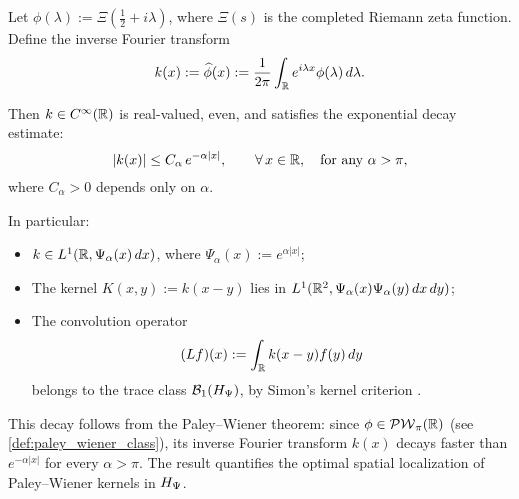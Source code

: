 \begin{lemma}
\label{lem:decay_inverse_fourier_xi}
Let \( \phi(\lambda) := \Xi\left( \tfrac{1}{2} + i\lambda \right) \), where \( \Xi(s) \) is the completed Riemann zeta function. Define the inverse Fourier transform
\[
k(x) := \widehat{\phi}(x) := \frac{1}{2\pi} \int_{\mathbb{R}} e^{i\lambda x} \phi(\lambda)\, d\lambda.
\]

Then \( k \in C^\infty(\mathbb{R}) \) is real-valued, even, and satisfies the exponential decay estimate:
\[
|k(x)| \le C_\alpha\, e^{-\alpha |x|}, \qquad \forall\, x \in \mathbb{R}, \quad \text{for any } \alpha > \pi,
\]
where \( C_\alpha > 0 \) depends only on \( \alpha \).

\medskip
\noindent In particular:
\begin{itemize}
  \item \( k \in L^1(\mathbb{R}, \Psi_\alpha(x)\, dx) \), where \( \Psi_\alpha(x) := e^{\alpha |x|} \);
  \item The kernel \( K(x,y) := k(x - y) \) lies in \( L^1(\mathbb{R}^2, \Psi_\alpha(x)\Psi_\alpha(y)\, dx\, dy) \);
  \item The convolution operator
  \[
  (Lf)(x) := \int_{\mathbb{R}} k(x - y) f(y)\, dy
  \]
  belongs to the trace class \( \mathcal{B}_1(H_{\Psi}) \), by Simon’s kernel criterion \cite[Thm.~4.2]{Simon2005TraceIdeals}.
\end{itemize}

\medskip
\noindent
This decay follows from the Paley--Wiener theorem: since \( \phi \in \mathcal{PW}_{\pi}(\mathbb{R}) \) (see \cref{def:paley_wiener_class}), its inverse Fourier transform \( k(x) \) decays faster than \( e^{-\alpha |x|} \) for every \( \alpha > \pi \). The result quantifies the optimal spatial localization of Paley--Wiener kernels in \( H_{\Psi} \).
\end{lemma}

